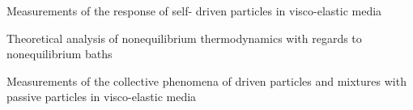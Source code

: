 \begin{workpackage}
\begin{wpdelivs}
  \begin{wpdeliv}[due=48,id=brown-d3,dissem=PU,nature=DEM,lead=USTUTT,miles=final]
       {Measurements of the response of self- driven particles in visco-elastic media}
 \end{wpdeliv}
\begin{wpdeliv}[due=48,id=brown-d4,dissem=PU,nature=DEM,lead=USTUTT,miles=final]
      {Theoretical analysis of nonequilibrium thermodynamics with regards to nonequilibrium baths}
\end{wpdeliv}
 \begin{wpdeliv}[due=48,id=brown-d5,dissem=PU,nature=DEM,lead=USTUTT,miles=final]
      {Measurements of the collective phenomena of driven particles and mixtures with passive particles in visco-elastic media}
\end{wpdeliv}
\end{wpdelivs}

\end{workpackage}
